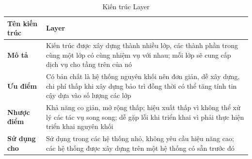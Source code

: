 \begin{table}
	\begin{tabular}{|p{3cm}|p{12cm}|}
		\hline
		\textbf{Tên kiến trúc} & Layer  \\ 
		\hline
		\textbf{Mô tả} & Kiến trúc được xây dựng thành nhiều lớp, các thành phần trong cùng một lớp có cùng nhiệm vụ với nhau; mỗi lớp sẽ cung cấp dịch vụ cho tầng trên của nó  \\ 
		\hline
		\textbf{Ưu điểm} & Có bản chất là hệ thống nguyên khối nên đơn giản, dễ xây dựng, chi phí thấp khi xây dựng bảo trì đồng thời có thể tăng tính tin cậy dựa vào số lượng các lớp     \\ 
		\hline
		\textbf{Nhược điểm} & Khả năng co giản, mở rộng thấp; hiệu xuất thấp vì không thể xử lý các tác vụ song song; dễ gặp lỗi khi triển khai vì phải thực hiện triển khai nguyên khối   \\ 
		\hline
		\textbf{Sử dụng cho} & Sử dụng trong các hệ thống nhỏ, không yêu cầu hiệu năng cao; các hệ thống được xây dựng trên một hệ thống có sẵn trước đó \\ 
		\hline
		
	\end{tabular}
	\caption{Kiến trúc Layer}
\end{table}






